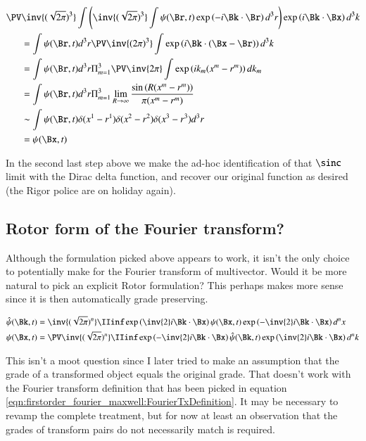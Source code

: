 \begin{align*}
\PV &\inv{(\sqrt{2\pi})^3} \int 
\left( \inv{(\sqrt{2\pi})^3} \int \psi(\Br, t) \exp\left( -i \Bk \cdot \Br \right) d^3 r \right)
\exp\left( i \Bk \cdot \Bx \right) d^3 k \\
&= \int \psi(\Br, t) d^3 r \PV \inv{({2\pi})^3} \int \exp\left( i \Bk \cdot (\Bx -\Br) \right) d^3 k \\
&= \int \psi(\Br, t) d^3 r \Pi_{m=1}^3 \PV \inv{{2\pi}} \int \exp\left( i k_m (x^m -r^m) \right) dk_m \\
&= \int \psi(\Br, t) d^3 r \Pi_{m=1}^3 \lim_{R\rightarrow \infty} \frac{\sin\left( R (x^m -r^m) \right)}{\pi(x^m - r^m)} \\
&\sim \int \psi(\Br, t) \delta(x^1-r^1) \delta(x^2-r^2) \delta(x^3-r^3) d^3 r \\
&= \psi(\Bx, t)
\end{align*}

In the second last step above we make the ad-hoc identification of that $\sinc$ limit with the Dirac delta function, and recover
our original function as desired (the Rigor police are on holiday again).

\subsection{Rotor form of the Fourier transform? }

Although the formulation picked above appears to work, it isn't the only choice to potentially make for the Fourier transform
of multivector.  Would it be more natural to pick an explicit Rotor formulation?  This perhaps makes more sense since it is then
automatically grade preserving.

\begin{align}\label{eqn:firstorder_fourier_maxwell:rotorFourier}
\hat{\psi}(\Bk, t) &= \inv{(\sqrt{2\pi})^n} \IIinf \exp\left( \inv{2} i \Bk \cdot \Bx \right) \psi(\Bx, t) \exp\left( - \inv{2} i \Bk \cdot \Bx \right) d^n x \\
{\psi}(\Bx, t) &= \PV \inv{(\sqrt{2\pi})^n} \IIinf \exp\left( -\inv{2} i \Bk \cdot \Bx \right) \hat{\psi}(\Bk, t) \exp\left( \inv{2} i \Bk \cdot \Bx \right) d^n k
\end{align}

This isn't a moot question since I later
tried to make an assumption that the grade of a transformed object equals the original grade.  That doesn't work with the
Fourier transform definition that has been picked in equation \ref{eqn:firstorder_fourier_maxwell:FourierTxDefinition}.  It may be necessary to revamp the complete treatment, but
for now at least an observation that the grades of transform pairs do not necessarily match is required.

